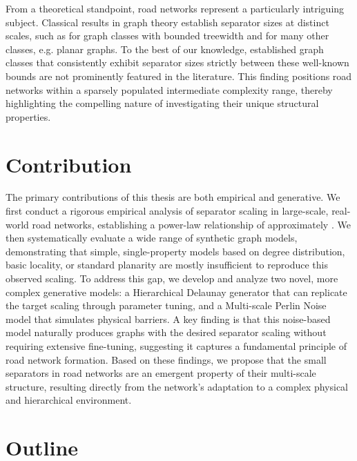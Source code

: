 From a theoretical standpoint, road networks represent a particularly intriguing subject.
Classical results in graph theory establish separator sizes at distinct scales, such as  for graph classes with bounded treewidth and  for many other classes, e.g. planar graphs.
To the best of our knowledge, established graph classes that consistently exhibit separator sizes strictly between these well-known bounds are not prominently featured in the literature.
This finding positions road networks within a sparsely populated intermediate complexity range, thereby highlighting the compelling nature of investigating their unique structural properties.

\section{Contribution}
\label{sec:contribution}

The primary contributions of this thesis are both empirical and generative.
We first conduct a rigorous empirical analysis of separator scaling in large-scale, real-world road networks, establishing a power-law relationship of approximately .
We then systematically evaluate a wide range of synthetic graph models, demonstrating that simple, single-property models based on degree distribution, basic locality, or standard planarity are mostly insufficient to reproduce this observed scaling.
To address this gap, we develop and analyze two novel, more complex generative models: a Hierarchical Delaunay generator that can replicate the target scaling through parameter tuning, and a Multi-scale Perlin Noise model that simulates physical barriers.
A key finding is that this noise-based model naturally produces graphs with the desired  separator scaling without requiring extensive fine-tuning, suggesting it captures a fundamental principle of road network formation.
Based on these findings, we propose that the small separators in road networks are an emergent property of their multi-scale structure, resulting directly from the network's adaptation to a complex physical and hierarchical environment.

\section{Outline}
\label{sec:outline}


